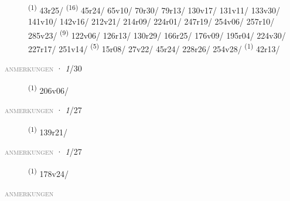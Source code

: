\begin{description}
    \item[]  \textsuperscript{(1)} \mbox{43r25/} \textsuperscript{(16)} \mbox{45r24/} \mbox{65v10/} \mbox{70r30/} \mbox{79r13/} \mbox{130v17/} \mbox{131v11/} \mbox{133v30/} \mbox{141v10/} \mbox{142v16/} \mbox{212v21/} \mbox{214r09/} \mbox{224r01/} \mbox{247r19/} \mbox{254v06/} \mbox{257r10/} \mbox{285v23/} \CASEBREAK {} \textsuperscript{(9)} \mbox{122v06/} \mbox{126r13/} \mbox{130r29/} \mbox{166r25/} \mbox{176v09/} \mbox{195r04/} \mbox{224v30/} \mbox{227r17/} \mbox{251v14/} \CASEBREAK {} \textsuperscript{(5)} \mbox{15r08/} \mbox{27v22/} \mbox{45r24/} \mbox{228r26/} \mbox{254v28/} \textsuperscript{(1)} \mbox{42r13/}
\end{description}
\textsc{\textcolor{gray}{anmerkungen}}
\ENTRYEND
\noindent{} · \textit{1}/30 \LEMMALINE
\begin{description}
    \item[]  \textsuperscript{(1)} \mbox{206v06/}
\end{description}
\textsc{\textcolor{gray}{anmerkungen}}
\ENTRYEND
\noindent{} · \textit{1}/27 \LEMMALINE
\begin{description}
    \item[]  \textsuperscript{(1)} \mbox{139r21/}
\end{description}
\textsc{\textcolor{gray}{anmerkungen}}
\ENTRYEND
\noindent{} · \textit{1}/27 \LEMMALINE
\begin{description}
    \item[]  \textsuperscript{(1)} \mbox{178v24/}
\end{description}
\textsc{\textcolor{gray}{anmerkungen}}
\ENTRYEND
